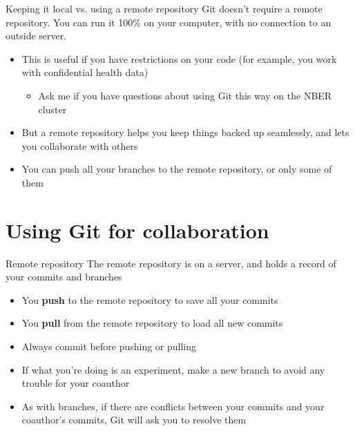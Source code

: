 \documentclass{beamer}
\begin{document}
\begin{frame}{Keeping it local vs. using a remote repository}
Git doesn't require a remote repository. You can run it 100\% on your computer, with no connection to an outside server.
\begin{itemize}
\item This is useful if you have restrictions on your code (for example, you work with confidential health data)
\begin{itemize}
\item Ask me if you have questions about using Git this way on the NBER cluster
\end{itemize}
\item But a remote repository helps you keep things backed up seamlessly, and lets you collaborate with others
\item You can push all your branches to the remote repository, or only some of them
\end{itemize}

\end{frame}

\section{Using Git for collaboration}

\begin{frame}{Remote repository}
The remote repository is on a server, and holds a record of your commits and branches
\begin{itemize}
\item You \textbf{push} to the remote repository to save all your commits
\item You \textbf{pull} from the remote repository to load all new commits
\item Always commit before pushing or pulling
\item If what you're doing is an experiment, make a new branch to avoid any trouble for your coauthor
\item As with branches, if there are conflicts between your commits and your coauthor's commits, Git will ask you to resolve them
\end{itemize}
\end{frame}
\end{document}
